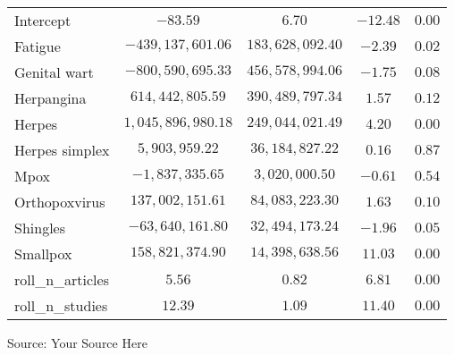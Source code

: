 \begin{longtable}{l|cccc}
\midrule\addlinespace[2.5pt]
Intercept & $-83.59$ & $6.70$ & $-12.48$ & $0.00$ \\ 
Fatigue & $-439,137,601.06$ & $183,628,092.40$ & $-2.39$ & $0.02$ \\ 
Genital wart & $-800,590,695.33$ & $456,578,994.06$ & $-1.75$ & $0.08$ \\ 
Herpangina & $614,442,805.59$ & $390,489,797.34$ & $1.57$ & $0.12$ \\ 
Herpes & $1,045,896,980.18$ & $249,044,021.49$ & $4.20$ & $0.00$ \\ 
Herpes simplex & $5,903,959.22$ & $36,184,827.22$ & $0.16$ & $0.87$ \\ 
Mpox & $-1,837,335.65$ & $3,020,000.50$ & $-0.61$ & $0.54$ \\ 
Orthopoxvirus & $137,002,151.61$ & $84,083,223.30$ & $1.63$ & $0.10$ \\ 
Shingles & $-63,640,161.80$ & $32,494,173.24$ & $-1.96$ & $0.05$ \\ 
Smallpox & $158,821,374.90$ & $14,398,638.56$ & $11.03$ & $0.00$ \\ 
roll\_n\_articles & $5.56$ & $0.82$ & $6.81$ & $0.00$ \\ 
roll\_n\_studies & $12.39$ & $1.09$ & $11.40$ & $0.00$ \\ 
\bottomrule
\end{longtable}
\begin{minipage}{\linewidth}
Source: Your Source Here\\
\end{minipage}

